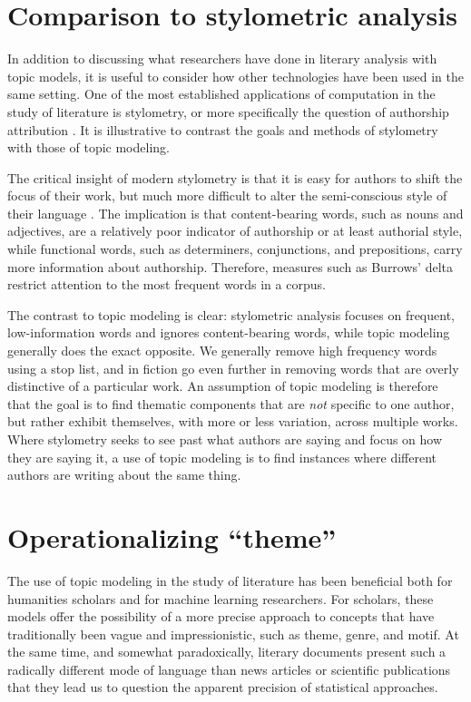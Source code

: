 \section{Comparison to stylometric analysis}

In addition to discussing what researchers have done in literary analysis with topic models, it is useful to consider how other technologies have been used in the same setting.
One of the most established applications of computation in the study of literature is stylometry, or more specifically the question of authorship attribution \cite{juola2006authorship}.
It is illustrative to contrast the goals and methods of stylometry with those of topic modeling.

The critical insight of modern stylometry is that it is easy for authors to shift the focus of their work, but much more difficult to alter the semi-conscious style of their language \cite{mosteller1964inference}.
The implication is that content-bearing words, such as nouns and adjectives, are a relatively poor indicator of authorship or at least authorial style, while functional words, such as determiners, conjunctions, and prepositions, carry more information about authorship.
Therefore, measures such as Burrows' delta \cite{burrows2002delta} restrict attention to the most frequent words in a corpus.

The contrast to topic modeling is clear: stylometric analysis focuses on frequent, low-information words and ignores content-bearing words, while topic modeling generally does the exact opposite.
We generally remove high frequency words using a stop list, and in fiction go even further in removing words that are overly distinctive of a particular work.
An assumption of topic modeling is therefore that the goal is to find thematic components that are {\em not} specific to one author, but rather exhibit themselves, with more or less variation, across multiple works.
Where stylometry seeks to see past what authors are saying and focus on how they are saying it, a use of topic modeling is to find instances where different authors are writing about the same thing.

\section{Operationalizing ``theme''}

The use of topic modeling in the study of literature has been beneficial both for humanities scholars and for machine learning researchers.
For scholars, these models offer the possibility of a more precise approach to concepts that have traditionally been vague and impressionistic, such as theme, genre, and motif.
At the same time, and somewhat paradoxically, literary documents present such a radically different mode of language than news articles or scientific publications that they lead us to question the apparent precision of statistical approaches.

